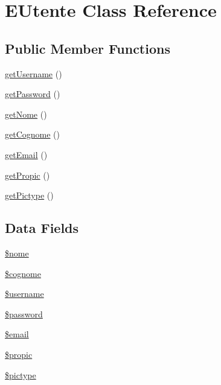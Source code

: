 \hypertarget{class_e_utente}{}\section{E\+Utente Class Reference}
\label{class_e_utente}
\subsection*{Public Member Functions}
\begin{DoxyCompactItemize}
\item 
\mbox{\hyperlink{class_e_utente_a81b37a3c9d639574e394f80c1138c75e}{get\+Username}} ()
\item 
\mbox{\hyperlink{class_e_utente_a04e0957baeb7acde9c0c86556da2d43f}{get\+Password}} ()
\item 
\mbox{\hyperlink{class_e_utente_a67fa74a47af3f2f9eeced7c37c2ef0d3}{get\+Nome}} ()
\item 
\mbox{\hyperlink{class_e_utente_aa114419de31d6dd2151842ea68f84283}{get\+Cognome}} ()
\item 
\mbox{\hyperlink{class_e_utente_a02a01849f28e2535e888ae4ec87b20f2}{get\+Email}} ()
\item 
\mbox{\hyperlink{class_e_utente_afb77cb35ab7e2fba8cb983fbbbb8bfd8}{get\+Propic}} ()
\item 
\mbox{\hyperlink{class_e_utente_ad7692598156e778e9c744ed7b32877fd}{get\+Pictype}} ()
\end{DoxyCompactItemize}
\subsection*{Data Fields}
\begin{DoxyCompactItemize}
\item 
\mbox{\hyperlink{class_e_utente_ac8c9d9dd5d90fa5854f0cb8397084ebd}{\$nome}}
\item 
\mbox{\hyperlink{class_e_utente_a600d90f1a17195713d76b84391b6cd1c}{\$cognome}}
\item 
\mbox{\hyperlink{class_e_utente_a0eb82aa5f81cf845de4b36cd653c42cf}{\$username}}
\item 
\mbox{\hyperlink{class_e_utente_a607686ef9f99ea7c42f4f3dd3dbb2b0d}{\$password}}
\item 
\mbox{\hyperlink{class_e_utente_ad634f418b20382e2802f80532d76d3cd}{\$email}}
\item 
\mbox{\hyperlink{class_e_utente_a370d785eb969be83a769ca72d7e0928f}{\$propic}}
\item 
\mbox{\hyperlink{class_e_utente_a1937c4f9f759593c70a6a69a74ea8f01}{\$pictype}}
\end{DoxyCompactItemize}



